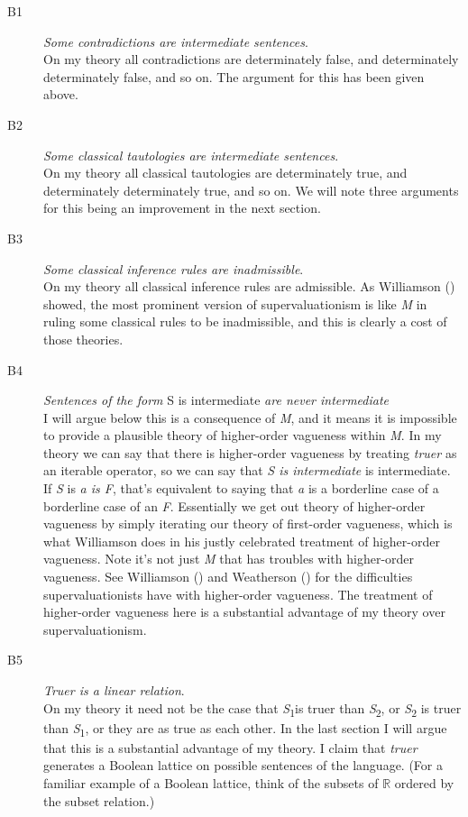 \documentclass[
  10pt,
  letterpaper,
  DIV=11,
  numbers=noendperiod,
  twoside]{scrartcl}
\begin{document}
\begin{description}
\item[B1]
\emph{Some contradictions are intermediate sentences}.\\
On my theory all contradictions are determinately false, and
determinately determinately false, and so on. The argument for this has
been given above.
\item[B2]
\emph{Some classical tautologies are intermediate sentences}.\\
On my theory all classical tautologies are determinately true, and
determinately determinately true, and so on. We will note three
arguments for this being an improvement in the next section.
\item[B3]
\emph{Some classical inference rules are inadmissible}.\\
On my theory all classical inference rules are admissible. As Williamson
() showed, the most prominent
version of supervaluationism is like \emph{M} in ruling some classical
rules to be inadmissible, and this is clearly a cost of those theories.
\item[B4]
\emph{Sentences of the form} S is intermediate \emph{are never
intermediate}\\
I will argue below this is a consequence of \emph{M}, and it means it is
impossible to provide a plausible theory of higher-order vagueness
within \emph{M}. In my theory we can say that there is higher-order
vagueness by treating \emph{truer} as an iterable operator, so we can
say that \emph{S is intermediate} is intermediate. If \emph{S} is
\emph{a is F}, that's equivalent to saying that \emph{a} is a borderline
case of a borderline case of an \emph{F}. Essentially we get out theory
of higher-order vagueness by simply iterating our theory of first-order
vagueness, which is what Williamson does in his justly celebrated
treatment of higher-order vagueness. Note it's not just \emph{M} that
has troubles with higher-order vagueness. See Williamson
() and Weatherson
() for the difficulties
supervaluationists have with higher-order vagueness. The treatment of
higher-order vagueness here is a substantial advantage of my theory over
supervaluationism.
\item[B5]
\emph{Truer is a linear relation}.\\
On my theory it need not be the case that \emph{S}\textsubscript{1}is
truer than \emph{S}\textsubscript{2}, or \emph{S}\textsubscript{2} is
truer than \emph{S}\textsubscript{1}, or they are as true as each other.
In the last section I will argue that this is a substantial advantage of
my theory. I claim that \emph{truer} generates a Boolean lattice on
possible sentences of the language. (For a familiar example of a Boolean
lattice, think of the subsets of \(\mathbb{R}\) ordered by the subset
relation.)
\end{description}
\end{document}
